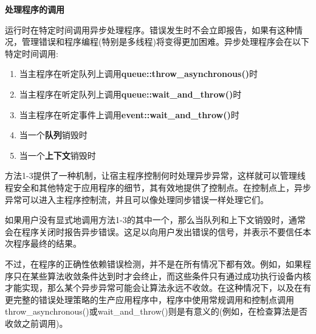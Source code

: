 \hspace*{\fill} \par %
\textbf{处理程序的调用}

运行时在特定时间调用异步处理程序。错误发生时不会立即报告，如果有这种情况，管理错误和程序编程(特别是多线程)将变得更加困难。异步处理程序会在以下特定时间调用:\par

\begin{enumerate}
	\item 当主程序在听定队列上调用\textbf{queue::throw\_asynchronous()}时
	\item 当主程序在听定队列上调用\textbf{queue::wait\_and\_throw()}时
	\item 当主程序在听定事件上调用\textbf{event::wait\_and\_throw()}时
	\item 当一个\textbf{队列}销毁时
	\item 当一个\textbf{上下文}销毁时
\end{enumerate}

方法1-3提供了一种机制，让宿主程序控制何时处理异步异常，这样就可以管理线程安全和其他特定于应用程序的细节，其有效地提供了控制点。在控制点上，异步异常可以进入主程序控制流，并且可以像处理同步错误一样处理它们。\par

如果用户没有显式地调用方法1-3的其中一个，那么当队列和上下文销毁时，通常会在程序关闭时报告异步错误。这足以向用户发出错误的信号，并表示不要信任本次程序最终的结果。\par

不过，在程序的正确性依赖错误检测，并不是在所有情况下都有效。例如，如果程序只在某些算法收敛条件达到时才会终止，而这些条件只有通过成功执行设备内核才能实现，那么某个异步异常可能会让算法永远不收敛。在这种情况下，以及在有更完整的错误处理策略的生产应用程序中，程序中使用常规调用和控制点调用throw\_asynchronous()或wait\_and\_throw()则是有意义的(例如，在检查算法是否收敛之前调用)。\par



















